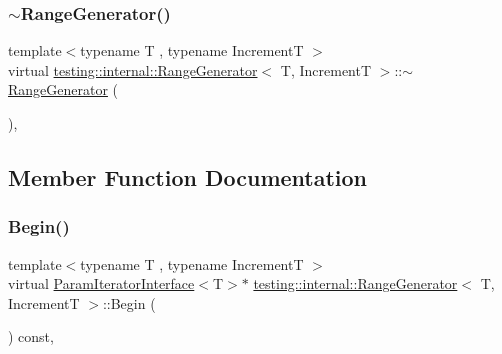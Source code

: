 \subsubsection{\texorpdfstring{$\sim$RangeGenerator()}{~RangeGenerator()}\hspace{0.1cm}{\footnotesize\ttfamily [3/3]}}
{\footnotesize\ttfamily template$<$typename T , typename IncrementT $>$ \\
virtual \mbox{\hyperlink{classtesting_1_1internal_1_1_range_generator}{testing\+::internal\+::\+Range\+Generator}}$<$ T, IncrementT $>$\+::$\sim$\mbox{\hyperlink{classtesting_1_1internal_1_1_range_generator}{Range\+Generator}} (\begin{DoxyParamCaption}{ }\end{DoxyParamCaption})\hspace{0.3cm}{\ttfamily [inline]}, {\ttfamily [virtual]}}



\subsection{Member Function Documentation}
\mbox{\label{classtesting_1_1internal_1_1_range_generator_ae68b59f9348ecf93e0947545a2424765}} 
\subsubsection{\texorpdfstring{Begin()}{Begin()}\hspace{0.1cm}{\footnotesize\ttfamily [1/3]}}
{\footnotesize\ttfamily template$<$typename T , typename IncrementT $>$ \\
virtual \mbox{\hyperlink{classtesting_1_1internal_1_1_param_iterator_interface}{Param\+Iterator\+Interface}}$<$T$>$$\ast$ \mbox{\hyperlink{classtesting_1_1internal_1_1_range_generator}{testing\+::internal\+::\+Range\+Generator}}$<$ T, IncrementT $>$\+::Begin (\begin{DoxyParamCaption}{ }\end{DoxyParamCaption}) const\hspace{0.3cm}{\ttfamily [inline]}, {\ttfamily [virtual]}}



